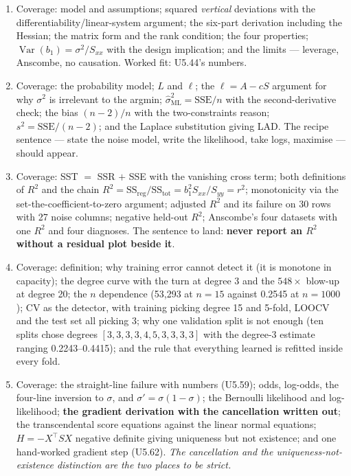 \documentclass[11pt,a4paper]{article}
\newcommand{\A}[1]{\item[\textbf{#1}]}
\begin{document}
\begin{enumerate}[leftmargin=1.9cm]
\A{U5.68} Coverage: model and assumptions; squared \emph{vertical} deviations
with the differentiability/linear-system argument; the six-part derivation
including the Hessian; the matrix form and the rank condition; the four
properties; $\operatorname{Var}(b_1) = \sigma^2/S_{xx}$ with the design
implication; and the limits --- leverage, Anscombe, no causation. Worked fit:
U5.44's numbers.

\A{U5.69} Coverage: the probability model; $L$ and $\ell$; the
$\ell = A - cS$ argument for why $\sigma^2$ is irrelevant to the argmin;
$\hat\sigma^2_{\text{ML}} = \text{SSE}/n$ with the second-derivative check;
the bias $(n-2)/n$ with the two-constraints reason; $s^2 = \text{SSE}/(n-2)$;
and the Laplace substitution giving LAD. The recipe sentence --- state the
noise model, write the likelihood, take logs, maximise --- should appear.

\A{U5.70} Coverage: SST $=$ SSR $+$ SSE with the vanishing cross term; both
definitions of $R^2$ and the chain
$R^2 = \text{SS}_{\text{reg}}/\text{SS}_{\text{tot}} = b_1^2S_{xx}/S_{yy} =
r^2$; monotonicity via the set-the-coefficient-to-zero argument; adjusted
$R^2$ and its failure on 30 rows with 27 noise columns; negative held-out
$R^2$; Anscombe's four datasets with one $R^2$ and four diagnoses. The
sentence to land: \textbf{never report an $R^2$ without a residual plot beside
it}.

\A{U5.71} Coverage: definition; why training error cannot detect it (it is
monotone in capacity); the degree curve with the turn at degree 3 and the
$548\times$ blow-up at degree 20; the $n$ dependence (53{,}293 at $n=15$ against
0.2545 at $n=1000$); CV as the detector, with training picking degree 15 and
5-fold, LOOCV and the test set all picking 3; why one validation split is not
enough (ten splits chose degrees $[3,3,3,3,4,5,3,3,3,3]$ with the degree-3
estimate ranging 0.2243--0.4415); and the rule that everything learned is
refitted inside every fold.

\A{U5.72} Coverage: the straight-line failure with numbers (U5.59); odds,
log-odds, the four-line inversion to $\sigma$, and $\sigma' = \sigma(1-\sigma)$;
the Bernoulli likelihood and log-likelihood; \textbf{the gradient derivation
with the cancellation written out}; the transcendental score equations against
the linear normal equations; $H = -X^\top SX$ negative definite giving
uniqueness but not existence; and one hand-worked gradient step (U5.62).
\emph{The cancellation and the uniqueness-not-existence distinction are the two
places to be strict.}


\end{enumerate}
\end{document}
